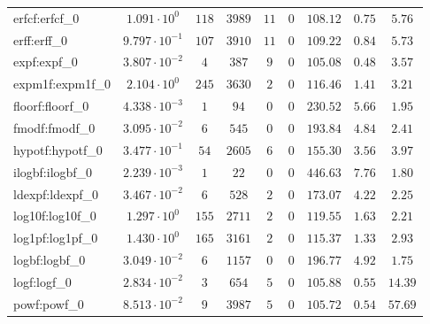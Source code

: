 \begin{tabular}{|l|c|c|c|c|c|c|c|c|}
erfcf:erfcf\_0               & $ 1.091 \cdot 10^{0}  $ & $ 118    $ & $ 3989   $ & $ 11  $ & $ 0   $ & $ 108.12      $ & $ 0.75    $ & $ 5.76    $ \\
erff:erff\_0                 & $ 9.797 \cdot 10^{-1} $ & $ 107    $ & $ 3910   $ & $ 11  $ & $ 0   $ & $ 109.22      $ & $ 0.84    $ & $ 5.73    $ \\
expf:expf\_0                 & $ 3.807 \cdot 10^{-2} $ & $ 4      $ & $ 387    $ & $ 9   $ & $ 0   $ & $ 105.08      $ & $ 0.48    $ & $ 3.57    $ \\
expm1f:expm1f\_0             & $ 2.104 \cdot 10^{0}  $ & $ 245    $ & $ 3630   $ & $ 2   $ & $ 0   $ & $ 116.46      $ & $ 1.41    $ & $ 3.21    $ \\
floorf:floorf\_0             & $ 4.338 \cdot 10^{-3} $ & $ 1      $ & $ 94     $ & $ 0   $ & $ 0   $ & $ 230.52      $ & $ 5.66    $ & $ 1.95    $ \\
fmodf:fmodf\_0               & $ 3.095 \cdot 10^{-2} $ & $ 6      $ & $ 545    $ & $ 0   $ & $ 0   $ & $ 193.84      $ & $ 4.84    $ & $ 2.41    $ \\
hypotf:hypotf\_0             & $ 3.477 \cdot 10^{-1} $ & $ 54     $ & $ 2605   $ & $ 6   $ & $ 0   $ & $ 155.30      $ & $ 3.56    $ & $ 3.97    $ \\
ilogbf:ilogbf\_0             & $ 2.239 \cdot 10^{-3} $ & $ 1      $ & $ 22     $ & $ 0   $ & $ 0   $ & $ 446.63      $ & $ 7.76    $ & $ 1.80    $ \\
ldexpf:ldexpf\_0             & $ 3.467 \cdot 10^{-2} $ & $ 6      $ & $ 528    $ & $ 2   $ & $ 0   $ & $ 173.07      $ & $ 4.22    $ & $ 2.25    $ \\
log10f:log10f\_0             & $ 1.297 \cdot 10^{0}  $ & $ 155    $ & $ 2711   $ & $ 2   $ & $ 0   $ & $ 119.55      $ & $ 1.63    $ & $ 2.21    $ \\
log1pf:log1pf\_0             & $ 1.430 \cdot 10^{0}  $ & $ 165    $ & $ 3161   $ & $ 2   $ & $ 0   $ & $ 115.37      $ & $ 1.33    $ & $ 2.93    $ \\
logbf:logbf\_0               & $ 3.049 \cdot 10^{-2} $ & $ 6      $ & $ 1157   $ & $ 0   $ & $ 0   $ & $ 196.77      $ & $ 4.92    $ & $ 1.75    $ \\
logf:logf\_0                 & $ 2.834 \cdot 10^{-2} $ & $ 3      $ & $ 654    $ & $ 5   $ & $ 0   $ & $ 105.88      $ & $ 0.55    $ & $ 14.39   $ \\
powf:powf\_0                 & $ 8.513 \cdot 10^{-2} $ & $ 9      $ & $ 3987   $ & $ 5   $ & $ 0   $ & $ 105.72      $ & $ 0.54    $ & $ 57.69   $ \\

\end{tabular}
